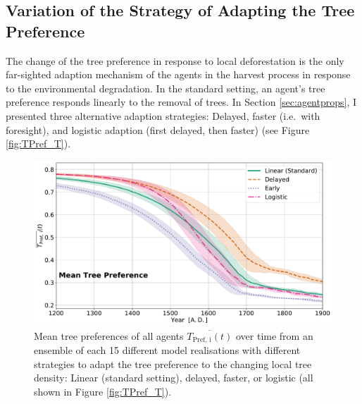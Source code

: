 \subsection{Variation of the Strategy of Adapting the Tree Preference}

The change of the tree preference in response to local deforestation is the only far-sighted adaption mechanism of the agents in the harvest process in response to the environmental degradation.
In the standard setting, an agent's tree preference responds linearly to the removal of trees.
In Section \ref{sec:agentprops}, I presented three alternative adaption strategies: Delayed, faster (i.e.\ with foresight), and logistic adaption (first delayed, then faster) (see Figure \ref{fig:TPref_T}).
\begin{figure}
	\centering
	\includegraphics[width=1\linewidth]{images/Results/TPref/TPrefAdaption_TPref}
	\caption{Mean tree preferences of all agents $\overline{T_\text{Pref, i}(t)}$ over time from an ensemble of each 15 different model realisations with different strategies to adapt the tree preference to the changing local tree density: Linear (standard setting), delayed, faster, or logistic (all shown in Figure \ref{fig:TPref_T}).}
	\label{fig:tprefadaptiontpref}
\end{figure}

